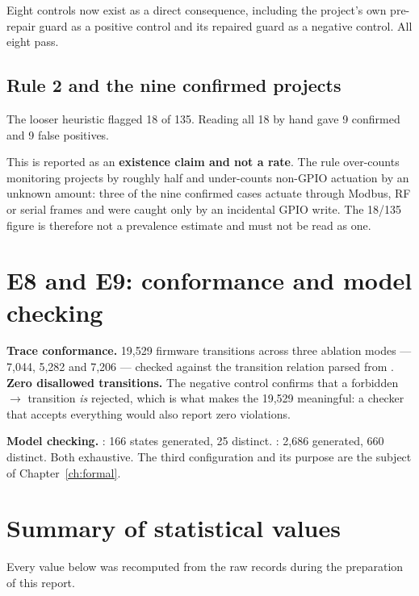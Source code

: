 Eight controls now exist as a direct consequence, including the project's own pre-repair guard
as a positive control and its repaired guard as a negative control. All eight pass.

\subsection{Rule 2 and the nine confirmed projects}

The looser heuristic flagged 18 of 135. Reading all 18 by hand gave 9 confirmed and 9 false
positives.

This is reported as an \textbf{existence claim and not a rate}. The rule over-counts monitoring
projects by roughly half and under-counts non-GPIO actuation by an unknown amount: three of the
nine confirmed cases actuate through Modbus, RF or serial frames and were caught only by an
incidental GPIO write. The 18/135 figure is therefore not a prevalence estimate and must not be
read as one.

\section{E8 and E9: conformance and model checking}

\textbf{Trace conformance.} 19,529 firmware transitions across three ablation modes — 7,044,
5,282 and 7,206 — checked against the transition relation parsed from .
\textbf{Zero disallowed transitions.} The negative control confirms that a forbidden
 $\rightarrow$  transition \emph{is} rejected, which is what makes
the 19,529 meaningful: a checker that accepts everything would also report zero violations.

\textbf{Model checking.} : 166 states generated, 25 distinct.
: 2,686 generated, 660 distinct. Both exhaustive. The third configuration and
its purpose are the subject of Chapter~\ref{ch:formal}.

\section{Summary of statistical values}

Every value below was recomputed from the raw records during the preparation of this report.

